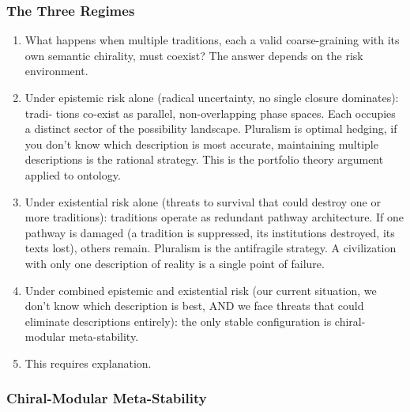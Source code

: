 \documentclass[
]{article}
\providecommand{\tightlist}{%
  \setlength{\itemsep}{0pt}\setlength{\parskip}{0pt}}
\begin{document}
\subsubsection{The Three Regimes}\label{the-three-regimes}

\begin{enumerate}
\def\labelenumi{\arabic{enumi}.}
\setcounter{enumi}{198}
\tightlist
\item
  What happens when multiple traditions, each a valid coarse-graining
  with its own semantic chirality, must coexist? The answer depends on
  the risk environment.
\item
  Under epistemic risk alone (radical uncertainty, no single closure
  dominates): tradi- tions co-exist as parallel, non-overlapping phase
  spaces. Each occupies a distinct sector of the possibility landscape.
  Pluralism is optimal hedging, if you don't know which description is
  most accurate, maintaining multiple descriptions is the rational
  strategy. This is the portfolio theory argument applied to ontology.
\item
  Under existential risk alone (threats to survival that could destroy
  one or more traditions): traditions operate as redundant pathway
  architecture. If one pathway is damaged (a tradition is suppressed,
  its institutions destroyed, its texts lost), others remain. Pluralism
  is the antifragile strategy. A civilization with only one description
  of reality is a single point of failure.
\item
  Under combined epistemic and existential risk (our current situation,
  we don't know which description is best, AND we face threats that
  could eliminate descriptions entirely): the only stable configuration
  is chiral-modular meta-stability.
\item
  This requires explanation.
\end{enumerate}

\subsubsection{Chiral-Modular
Meta-Stability}\label{chiral-modular-meta-stability}
\end{document}
